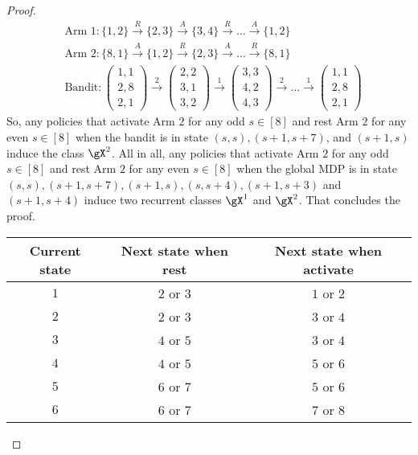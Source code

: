 \begin{proof}
    \begin{align*}
        &\text{Arm 1} : \{1,2\} \overset{R}{\to} \{2,3\} \overset{A}{\to} \{3,4\} \overset{R}{\to} \dots \overset{A}{\to} \{1,2\} \\
        &\text{Arm 2} : \{8,1\} \overset{A}{\to} \{1,2\} \overset{R}{\to} \{2,3\} \overset{A}{\to} \dots \overset{R}{\to} \{8,1\} \\
        &\text{Bandit} : \begin{pmatrix}1,1\\2,8\\2,1\end{pmatrix} \overset{2}{\to} \begin{pmatrix}2,2\\3,1\\3,2\end{pmatrix} \overset{1}{\to} \begin{pmatrix}3,3\\4,2\\4,3\end{pmatrix} \overset{2}{\to} \dots \overset{1}{\to} \begin{pmatrix}1,1\\2,8\\2,1\end{pmatrix}
    \end{align*}
    So, any policies that activate Arm $2$ for any odd $s\in[8]$ and rest Arm $2$ for any even $s\in[8]$ when the bandit is in state $(s,s), (s+1,s+7)$, and $(s+1,s)$ induce the class $\gX^2$.
    All in all, any policies that activate Arm $2$ for any odd $s\in[8]$ and rest Arm $2$ for any even $s\in[8]$ when the global MDP is in state $(s,s), (s+1,s+7), (s+1,s), (s,s+4), (s+1,s+3)$ and $(s+1,s+4)$ induce two recurrent classes $\gX^1$ and $\gX^2$.
    That concludes the proof.
    \begin{table}[ht]
        \centering
        \begin{tabular}{|c|c|c|}
            \hline
            Current state & Next state when rest & Next state when activate \\\hline 
            $1$   & $2$ or $3$  &  $1$ or $2$ \\
            $2$   & $2$ or $3$  &  $3$ or $4$ \\
            $3$   & $4$ or $5$  &  $3$ or $4$ \\
            $4$   & $4$ or $5$  &  $5$ or $6$ \\
            $5$   & $6$ or $7$  &  $5$ or $6$ \\
            $6$   & $6$ or $7$  &  $7$ or $8$ \\

\end{tabular}
\end{table}
\end{proof}
